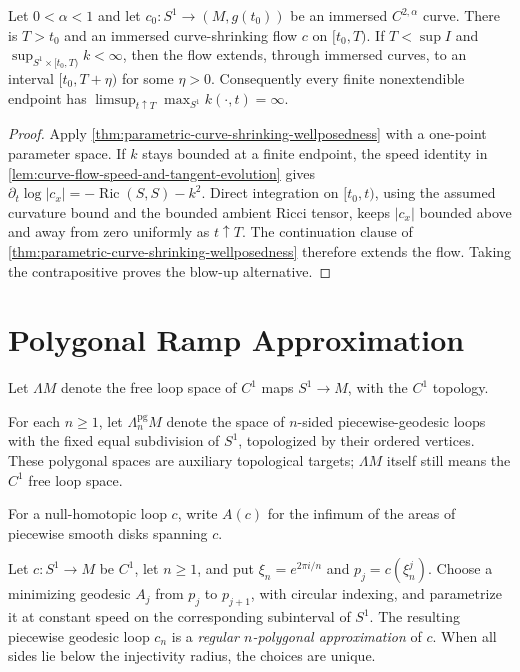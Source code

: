 \begin{theorem}
\label{thm:curve-shrinking-short-time-existence}
\notready
Let $0<\alpha<1$ and let
$c_0\colon S^1\to(M,g(t_0))$ be an immersed $C^{2,\alpha}$ curve.  There is
$T>t_0$ and an immersed curve-shrinking flow $c$ on $[t_0,T)$.  If
$T<\sup I$
and $\sup_{S^1\times[t_0,T)}k<\infty$, then the flow extends, through
immersed curves, to an interval $[t_0,T+\eta)$ for some $\eta>0$.
Consequently every finite nonextendible endpoint has
$\limsup_{t\uparrow T}\max_{S^1}k(\cdot,t)=\infty$.
\end{theorem}
\begin{proof}
Apply \ref{thm:parametric-curve-shrinking-wellposedness} with a one-point
parameter space.  If $k$ stays bounded at a finite endpoint, the speed
identity in \ref{lem:curve-flow-speed-and-tangent-evolution} gives
$\partial_t\log|c_x|=-\operatorname{Ric}(S,S)-k^2$.  Direct integration on
$[t_0,t)$, using the assumed curvature bound and the bounded ambient Ricci
tensor, keeps $|c_x|$ bounded above and away from zero uniformly as
$t\uparrow T$.
The continuation clause of
\ref{thm:parametric-curve-shrinking-wellposedness} therefore extends the flow.
Taking the contrapositive proves the blow-up alternative.
\end{proof}

\section{Polygonal Ramp Approximation}

Let $\Lambda M$ denote the free loop space of $C^1$ maps $S^1\to M$, with
the $C^1$ topology.

For each $n\ge1$, let $\Lambda_n^{\mathrm{pg}}M$ denote the space of
$n$-sided piecewise-geodesic loops with the fixed equal subdivision of $S^1$,
topologized by their ordered vertices.  These polygonal spaces are auxiliary
topological targets; $\Lambda M$ itself still means the $C^1$ free loop space.

For a null-homotopic loop $c$, write $A(c)$ for the infimum of the areas of
piecewise smooth disks spanning $c$.

\begin{definition}
\label{def:regular-polygonal-loop-approximation}
\notready
Let $c\colon S^1\to M$ be $C^1$, let $n\ge1$, and put
$\xi_n=e^{2\pi i/n}$ and $p_j=c(\xi_n^j)$.  Choose a minimizing geodesic
$A_j$ from $p_j$ to $p_{j+1}$, with circular indexing, and parametrize it at
constant speed on the corresponding subinterval of $S^1$.  The resulting
piecewise geodesic loop $c_n$ is a \emph{regular $n$-polygonal approximation}
of $c$.  When all sides lie below the injectivity radius, the choices are
unique.
\end{definition}

